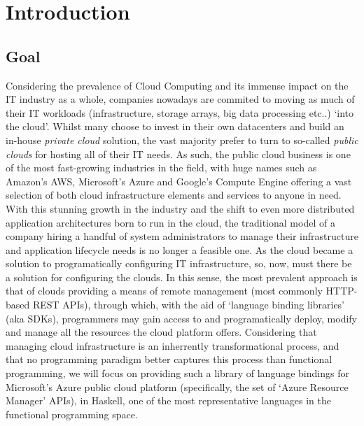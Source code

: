 \documentclass[11pt]{report}
\begin{document}
\tableofcontents{}

\renewcommand\listoflistingscaption{Listings:}
\listoflistings

\chapter{Introduction}

\section{Goal}

Considering the prevalence of Cloud Computing and its immense impact on the IT
industry as a whole, companies nowadays are commited to moving as much of their
IT workloads (infrastructure, storage arrays, big data processing etc..) `into
the cloud'. Whilst many choose to invest in their own datacenters and build
an in-house \textit{private cloud} solution, the vast majority prefer to turn
to so-called \textit{public clouds} for hosting all of their IT needs. As such,
the public cloud business is one of the most fast-growing industries in the
field, with huge names such as Amazon's AWS, Microsoft's Azure and Google's
Compute Engine offering a vast selection of both cloud infrastructure elements
and services to anyone in need. \newline
With this stunning growth in the industry and the shift to even more distributed
application architectures born to run in the cloud, the traditional model of a
company hiring a handful of system administrators to manage their
infrastructure and application lifecycle needs is no longer a feasible one.
As the cloud became a solution to programatically configuring IT
infrastructure, so, now, must there be a solution for configuring the clouds.
In this sense, the most prevalent approach is that of clouds providing a means of
remote management (most commonly HTTP-based REST APIs), through which, with the
aid of `language binding libraries' (aka SDKs), programmers may gain access to
and programatically deploy, modify and manage all the resources the cloud platform
offers. \newline
Considering that managing cloud infrastructure is an inherrently
transformational process, and that no programming paradigm better captures this
process than functional programming, we will focus on providing such a library
of language bindings for Microsoft's Azure public cloud platform (specifically,
the set of `Azure Resource Manager' APIs), in Haskell, one of the most
representative languages in the functional programming space.
\end{document}
